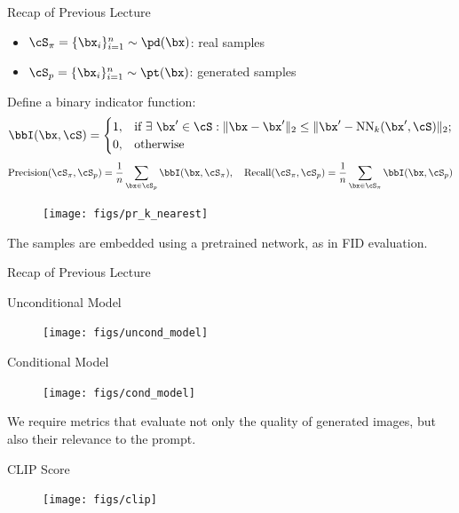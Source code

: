 \documentclass{beamer}
\begin{document}
\begin{frame}{Recap of Previous Lecture}
	\vspace{-0.2cm}
	\begin{itemize}
		\item $\cS_{\pi} = \{\bx_i\}_{i=1}^{n} \sim \pd(\bx)$: real samples
		\item $\cS_{p} = \{\bx_i\}_{i=1}^{n} \sim \pt(\bx)$: generated samples
	\end{itemize}
	Define a binary indicator function:
	\vspace{-0.2cm}
	\[
		\bbI(\bx, \cS) = 
		\begin{cases}
			1, & \text{if}~ \exists~ \bx' \in \cS: \| \bx  - \bx'\|_2 \leq \| \bx' - \text{NN}_k(\bx', \cS)\|_2; \\
			0, & \text{otherwise}
		\end{cases}
	\]
	\vspace{-0.3cm}
	\[
		\text{Precision} (\cS_{\pi}, \cS_{p}) = \frac{1}{n} \sum_{\bx \in \cS_{p}} \bbI(\bx, \cS_{\pi}),
		\quad
		\text{Recall} (\cS_{\pi}, \cS_{p}) = \frac{1}{n} \sum_{\bx \in \cS_{\pi}} \bbI(\bx, \cS_{p})
	\]
	\vspace{-0.7cm}
	\begin{figure}
		\texttt{[image: figs/pr\_k\_nearest]}
	\end{figure}
	\vspace{-0.3cm}
	The samples are embedded using a pretrained network, as in FID evaluation.
\end{frame}
\begin{frame}{Recap of Previous Lecture}
	\vspace{-0.2cm}
	\begin{minipage}{0.5\linewidth}
		\begin{block}{Unconditional Model}
			\begin{figure}
				\texttt{[image: figs/uncond\_model]}
			\end{figure}
		\end{block}
	\end{minipage}%
	\begin{minipage}{0.5\linewidth}
		\vspace{0.2cm}
		\begin{block}{Conditional Model}
			\begin{figure}
				\texttt{[image: figs/cond\_model]}
			\end{figure}
		\end{block}
	\end{minipage}
	We require metrics that evaluate not only the quality of generated images, but also their relevance to the prompt.
	\begin{block}{CLIP Score}
		\begin{figure}
			\texttt{[image: figs/clip]}
		\end{figure}
	\end{block}
\end{frame}
\end{document}
